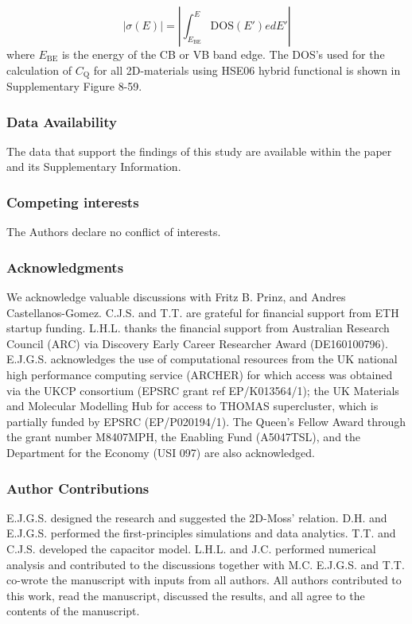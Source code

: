\documentclass[journal=ancac3,manuscript=article,email=true,hyperref=true,keywords=true]{achemso}
\begin{document}
\begin{equation}
  \label{eq:method-2}
  |\sigma(E)| = \left|\int_{E_{\mathrm{BE}}}^{E} \mathrm{DOS}(E')e dE' \right|
\end{equation}
where $E_{\mathrm{BE}}$ is the energy of the CB or VB band edge. 
The DOS's used for the calculation of $C_{\mathrm{Q}}$ 
for all 2D-materials using HSE06 hybrid functional is shown in Supplementary Figure 8-59. 


\subsubsection{Data Availability}

The data that support the findings of this study 
are available within the paper and its Supplementary Information.  

\subsubsection{Competing interests}
The Authors declare no conflict of interests.




\subsubsection{Acknowledgments}
We acknowledge valuable discussions with Fritz B. Prinz, and Andres Castellanos-Gomez. C.J.S. and T.T. are grateful for financial support from ETH startup funding. L.H.L. thanks the financial support from Australian Research Council (ARC) via Discovery Early Career Researcher Award (DE160100796). E.J.G.S. acknowledges the use of computational resources from the UK national high performance computing service (ARCHER) for which access was obtained via the UKCP consortium (EPSRC grant ref EP/K013564/1); the UK Materials and Molecular Modelling Hub for access to THOMAS supercluster, which is partially funded by EPSRC (EP/P020194/1). The Queen's Fellow Award through the grant number M8407MPH, the Enabling Fund (A5047TSL), and the Department for the Economy (USI 097) are also acknowledged.

\subsubsection{Author Contributions}
E.J.G.S. designed the research and suggested the 2D-Moss' relation. 
D.H. and E.J.G.S. performed the first-principles simulations 
and data analytics. T.T. and C.J.S. developed the capacitor model. L.H.L. and J.C. 
performed numerical analysis and contributed to the discussions together with M.C.
E.J.G.S. and T.T. co-wrote the manuscript with inputs from all authors. 
All authors contributed to this work, read the manuscript, discussed 
the results, and all agree to the contents of the manuscript. 
\end{document}
